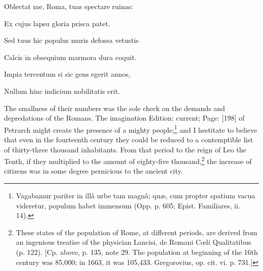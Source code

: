 {{}Oblectat me, Roma, tuas spectare ruinas:

Ex cujus lapsu gloria prisca patet.

Sed tuus hic populus muris defossa vetustis

Calcis in obsequium marmora dura coquit.

Impia tercentum si sic gens egerit annos,

Nullum hinc indicium nobilitatis erit.} The smallness of their numbers was the sole check on the demands and depredations of the Romans. The imagination Edition: current; Page: [198] of Petrarch might create the presence of a mighty people;\footnote{Vagabamur pariter in illâ urbe tam magnâ; quæ, cum propter spatium vacua videretur, populum habet immensum (Opp. p. 605; Epist. Familiares, ii. 14).} and I hestitate to believe that even in the fourteenth century they could be reduced to a contemptible list of thirty-three thousand inhabitants. From that period to the reign of Leo the Tenth, if they multiplied to the amount of eighty-five thousand,\footnote{These states of the population of Rome, at different periods, are derived from an ingenious treatise of the physician Lancisi, de Romani Cœli Qualitatibus (p. 122). [Cp. above, p. 135, note 29. The population at beginning of the 16th century was 85,000; in 1663, it was 105,433. Gregorovius, op. cit. vi. p. 731.]} the increase of citizens was in some degree pernicious to the ancient city.

